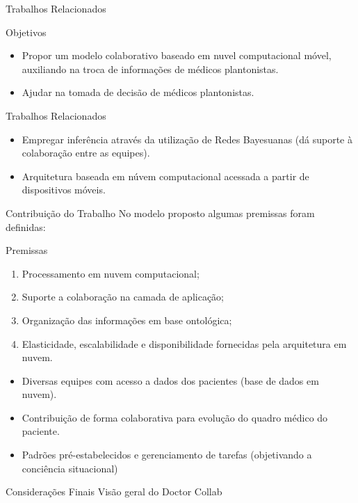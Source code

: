 \documentclass{beamer}
\begin{document}
\begin{frame}{Trabalhos Relacionados}
    \begin{block}{Objetivos}
      \begin{itemize}
        \item Propor um modelo colaborativo baseado em nuvel computacional móvel, auxiliando na troca de informações de médicos plantonistas.
        \item Ajudar na tomada de decisão de médicos plantonistas.
    \end{itemize}
  \end{block}
  \vskip 1cm
  \begin{block}{Trabalhos Relacionados}
    \begin{itemize}
        \item Empregar inferência através da utilização de Redes Bayesuanas (dá suporte à colaboração entre as equipes).
        \item Arquitetura baseada em núvem computacional acessada a partir de dispositivos móveis.
    \end{itemize}
  \end{block}
\end{frame}
\begin{frame}{Contribuição do Trabalho}
No modelo proposto algumas premissas foram definidas:
\begin{block}{Premissas}
  \begin{enumerate}[I]
    \item Processamento em nuvem computacional; 
    \item Suporte a colaboração na camada de aplicação; 
    \item Organização das informações em base ontológica; 
    \item Elasticidade, escalabilidade e disponibilidade fornecidas pela arquitetura em nuvem.
  \end{enumerate}
\end{block}
\begin{itemize}
    \item Diversas equipes com acesso a dados dos pacientes (base de dados em nuvem).
    \item Contribuição de forma colaborativa para evolução do quadro médico do paciente.
    \item Padrões pré-estabelecidos e gerenciamento de tarefas (objetivando a conciência situacional)
  \end{itemize}
\end{frame}

\begin{frame}{Considerações Finais}
    Visão geral do Doctor Collab
  \begin{figure}
  \end{figure}
\end{frame}


\end{document}
